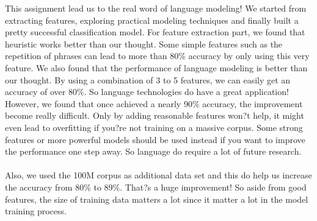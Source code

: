 This assignment lead us to the real word of language modeling! We started from extracting features, exploring practical modeling techniques and finally built a pretty successful classification model. For feature extraction part, we found that heuristic works better than our thought. Some simple features such as the repetition of phrases can lead to more than 80\% accuracy by only using this very feature. We also found that the performance of language modeling is better than our thought. By using a combination of 3 to 5 features, we can easily get an accuracy of over 80\%. So language technologies do have a great application! However, we found that once achieved a nearly 90\% accuracy, the improvement become really difficult. Only by adding reasonable features won?t help, it might even lead to overfitting if you?re not training on a massive corpus. Some strong features or more powerful models should be used instead if you want to improve the performance one step away. So language do require a lot of future research. \\\\
Also, we used the 100M corpus as additional data set and this do help us increase the accuracy from 80\% to 89\%. That?s a huge improvement! So aside from good features, the size of training data matters a lot since it matter a lot in the model training process.
